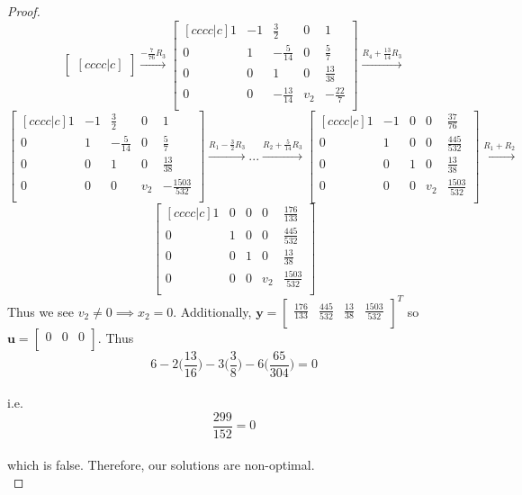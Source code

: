 \documentclass[12pt,oneside]{amsart}
\numberwithin{equation}{section}
\numberwithin{figure}{section}
\theoremstyle{plain}
\theoremstyle{definition}
\begin{document}
\begin{proof}
\[\begin{bmatrix}[cccc|c]
    \end{bmatrix} \overset{-\frac{7}{76}R_3}{\longrightarrow} \begin{bmatrix}[cccc|c]
    1 & -1 & \frac{3}{2}    & 0   & 1             \\
    0 & 1  & -\frac{5}{14}  & 0   & \frac{5}{7}   \\
    0 & 0  & 1              & 0   & \frac{13}{38} \\
    0 & 0  & -\frac{13}{14} & v_2 & -\frac{22}{7} \\
  \end{bmatrix} \overset{R_4 + \frac{13}{14}R_3}{\longrightarrow}\]
  \[\begin{bmatrix}[cccc|c]
    1 & -1 & \frac{3}{2}   & 0   & 1                 \\
    0 & 1  & -\frac{5}{14} & 0   & \frac{5}{7}       \\
    0 & 0  & 1             & 0   & \frac{13}{38}     \\
    0 & 0  & 0             & v_2 & -\frac{1503}{532} \\
    \end{bmatrix} \overset{R_1 - \frac{3}{2}R_3}{\longrightarrow} ... \overset{R_2 + \frac{5}{14}R_3}{\longrightarrow} \begin{bmatrix}[cccc|c]
    1 & -1 & 0 & 0   & \frac{37}{76}    \\
    0 & 1  & 0 & 0   & \frac{445}{532}  \\
    0 & 0  & 1 & 0   & \frac{13}{38}    \\
    0 & 0  & 0 & v_2 & \frac{1503}{532} \\
  \end{bmatrix} \overset{R_1 + R_2}{\longrightarrow} \]
  \[\begin{bmatrix}[cccc|c]
    1 & 0 & 0 & 0   & \frac{176}{133}  \\
    0 & 1 & 0 & 0   & \frac{445}{532}  \\
    0 & 0 & 1 & 0   & \frac{13}{38}    \\
    0 & 0 & 0 & v_2 & \frac{1503}{532} \\
  \end{bmatrix}\]
  Thus we see $v_2 \neq 0 \implies x_2 = 0$. Additionally, $\mathbf{y} = \begin{bmatrix}
    \frac{176}{133} & \frac{445}{532} & \frac{13}{38} & \frac{1503}{532} \\
  \end{bmatrix}^T$ so $\mathbf{u} = \begin{bmatrix}
    0 & 0 & 0 \\
  \end{bmatrix}$. Thus \\
  \[6 - 2\bigg(\frac{13}{16}\bigg) - 3\bigg(\frac{3}{8}\bigg) - 6\bigg(
  \frac{65}{304}\bigg) = 0\] \\
  i.e. \\
  \[\frac{299}{152} = 0\] \\
  which is false. Therefore, our solutions are non-optimal. \\
\end{proof}
\end{document}
